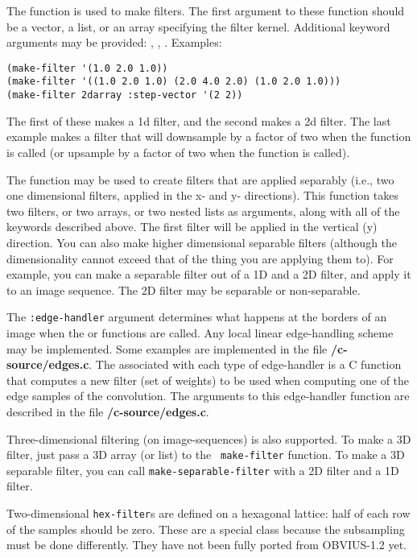 The function  is
used to make filters.  The first argument to these function should be a
vector, a list, or an array specifying the filter kernel.  Additional
keyword arguments may be provided: ,
, .  Examples:
\begin{verbatim}
(make-filter '(1.0 2.0 1.0))
(make-filter '((1.0 2.0 1.0) (2.0 4.0 2.0) (1.0 2.0 1.0)))
(make-filter 2darray :step-vector '(2 2))
\end{verbatim}
The first of these makes a 1d filter, and the second makes a 2d
filter.  The last example makes a filter that will downsample by a
factor of two when the  function is called (or
upsample by a factor of two when the  function is
called).

The function    may be used to create
filters that are applied separably (i.e., two one dimensional filters,
applied in the x- and y- directions).  This function takes two
filters, or two arrays, or two nested lists as arguments, along with
all of the keywords described above.  The first filter will be applied
in the vertical (y) direction.  You can also make higher dimensional
separable filters (although the dimensionality cannot exceed that of
the thing you are applying them to).  For example, you can make a
separable filter out of a 1D and a 2D filter, and apply it to an image
sequence.  The 2D filter may be separable or non-separable.  

The {\tt :edge-handler} argument determines what happens at the
borders of an image when the  or
 functions are called.  Any local linear
edge-handling scheme may be implemented.  Some examples are
implemented in the file {\bf {}/c-source/edges.c}.  The
associated with each type of edge-handler is a C function that
computes a new filter (set of weights) to be used when computing one
of the edge samples of the convolution.  The arguments to this
edge-handler function are described in the file {\bf
{}/c-source/edges.c}.

Three-dimensional filtering (on image-sequences) is also supported.
To make a 3D filter, just pass a 3D array (or list) to the {\tt
make-filter} function.  To make a 3D separable filter, you can call
{\tt make-separable-filter} with a 2D filter and a 1D filter.

Two-dimensional {\tt hex-filter}s are defined on a hexagonal lattice:
half of each row of the samples should be zero.  These are a special
class because the subsampling must be done differently.  They have not
been fully ported from OBVIUS-1.2 yet.

